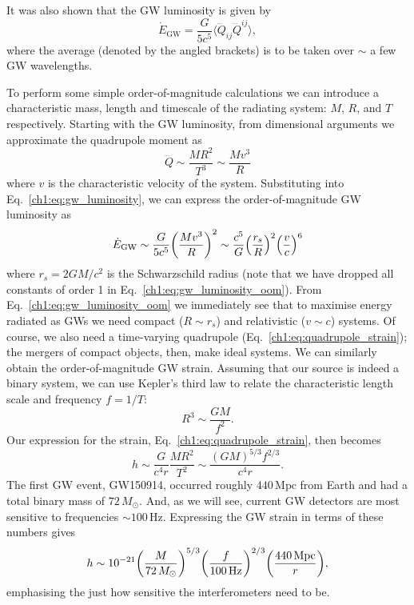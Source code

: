 It was also shown that the GW luminosity is given by
\begin{equation}\label{ch1:eq:gw_luminosity}
    \dot{E}_\mathrm{GW} = \frac{G}{5c^5} \bigl \langle \dddot{Q}_{ij} \dddot{Q}^{ij} \bigr \rangle,
\end{equation}
where the average (denoted by the angled brackets) is to be taken over $\sim$ a few GW wavelengths.

To perform some simple order-of-magnitude calculations we can introduce a characteristic mass, length and timescale of the radiating system: $M$, $R$, and $T$ respectively.
Starting with the GW luminosity, from dimensional arguments we approximate the quadrupole moment as 
\begin{equation}
    \dddot{Q} \sim \frac{MR^2}{T^3} \sim \frac{Mv^3}{R}
\end{equation}
where $v$ is the characteristic velocity of the system.
Substituting into Eq.~\ref{ch1:eq:gw_luminosity}, we can express the order-of-magnitude GW luminosity as
\begin{equation}\label{ch1:eq:gw_luminosity_oom}
    \dot{E}_\mathrm{GW} \sim \frac{G}{5c^5} \qty(\frac{Mv^3}{R})^2 \sim \frac{c^5}{G} \qty(\frac{r_s}{R})^2 \qty(\frac{v}{c})^6
\end{equation}
where $r_s = 2GM/c^2$ is the Schwarzschild radius (note that we have dropped all constants of order 1 in Eq.~\ref{ch1:eq:gw_luminosity_oom}).
From Eq.~\ref{ch1:eq:gw_luminosity_oom} we immediately see that to maximise energy radiated as GWs we need compact ($R \sim r_s$) and relativistic ($v \sim c$) systems.
Of course, we also need a time-varying quadrupole (Eq.~\ref{ch1:eq:quadrupole_strain}); the mergers of compact objects, then, make ideal systems.
We can similarly obtain the order-of-magnitude GW strain. 
Assuming that our source is indeed a binary system, we can use Kepler's third law to relate the characteristic length scale and frequency $f = 1/T$:
\begin{equation}
    R^3 \sim \frac{GM}{f^2}.
\end{equation}
Our expression for the strain, Eq.~\ref{ch1:eq:quadrupole_strain}, then becomes
\begin{equation}
    h \sim \frac{G}{c^4 r} \frac{MR^2}{T^2} \sim \frac{(GM)^{5/3}f^{2/3}}{c^4 r}.
\end{equation}
The first GW event, GW150914, occurred roughly $440\,\mathrm{Mpc}$ from Earth and had a total binary mass of $72\,M_\odot$.
And, as we will see, current GW detectors are most sensitive to frequencies $\sim 100\,\mathrm{Hz}$.
Expressing the GW strain in terms of these numbers gives
\begin{equation}\label{ch1:eq:quadrupole_strain_oom}
    h \sim 10^{-21} \qty(\frac{M}{72\,M_\odot})^{5/3} \qty(\frac{f}{100\,\mathrm{Hz}})^{2/3} \qty(\frac{440\,\mathrm{Mpc}}{r}),
\end{equation}
emphasising the just how sensitive the interferometers need to be.

